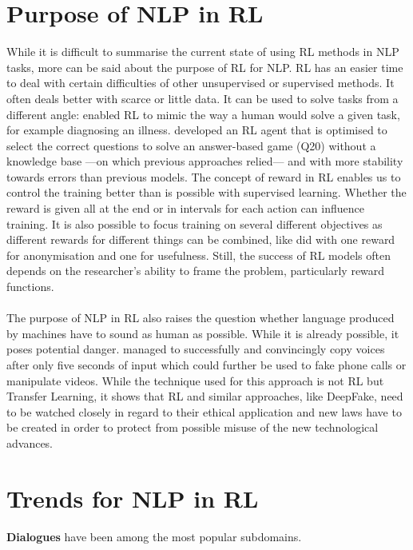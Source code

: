 \documentclass[11pt,a4paper]{article}
\begin{document}
\section{Purpose of NLP in RL}
While it is difficult to summarise the current state of using RL methods in NLP tasks, more can be said about the purpose of RL for NLP. RL has an easier time to deal with certain difficulties of other unsupervised or supervised methods. It often deals better with scarce or little data. It can be used to solve tasks from a different angle: \citet{ling-etal-2017-learning} enabled RL to mimic the way a human would solve a given task, for example diagnosing an illness. \citet{hu-etal-2018-playing} developed an RL agent that is optimised to select the correct questions to solve an answer-based game (Q20) without a knowledge base ---on which previous approaches relied--- and with more stability towards errors than previous models. The concept of reward in RL enables us to control the training better than is possible with supervised learning. Whether the reward is given all at the end or in intervals for each action can influence training. It is also possible to focus training on several different objectives as different rewards for different things can be combined, like \citet{mosallanezhad-etal-2019-deep} did with one reward for anonymisation and one for usefulness. Still, the success of RL models often depends on the researcher's ability to frame the problem, particularly reward functions.\\\\
The purpose of NLP in RL also raises the question whether language produced by machines have to sound as human as possible. While it is already possible, it poses potential danger. \citep{ye-2018-transfer} managed to successfully and convincingly copy voices after only five seconds of input which could further be used to fake phone calls or manipulate videos. While the technique used for this approach is not RL but Transfer Learning, it shows that RL and similar approaches, like DeepFake, need to be watched closely in regard to their ethical application and new laws have to be created in order to protect from possible misuse of the new technological advances. 


\section{Trends for NLP in RL}
\textbf{Dialogues} have been among the most popular subdomains.\\\\ 
\end{document}

